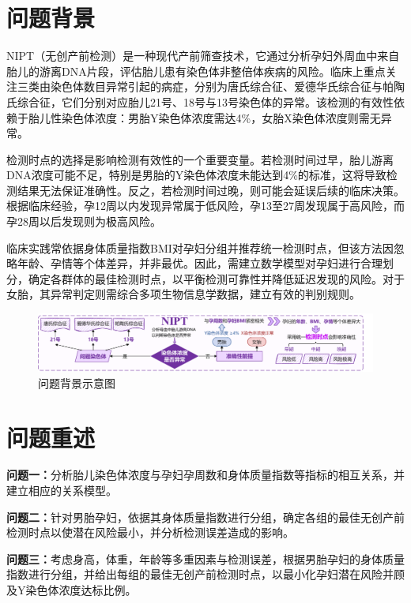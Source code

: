 \section{问题背景}


NIPT（无创产前检测）是一种现代产前筛查技术，它通过分析孕妇外周血中来自胎儿的游离DNA片段，评估胎儿患有染色体非整倍体疾病的风险。临床上重点关注三类由染色体数目异常引起的病症，分别为唐氏综合征、爱德华氏综合征与帕陶氏综合征，它们分别对应胎儿21号、18号与13号染色体的异常。该检测的有效性依赖于胎儿性染色体浓度：男胎Y染色体浓度需达4\%，女胎X染色体浓度则需无异常。

检测时点的选择是影响检测有效性的一个重要变量。若检测时间过早，胎儿游离DNA浓度可能不足，特别是男胎的Y染色体浓度未能达到4\%的标准，这将导致检测结果无法保证准确性。反之，若检测时间过晚，则可能会延误后续的临床决策。根据临床经验，孕12周以内发现异常属于低风险，孕13至27周发现属于高风险，而孕28周以后发现则为极高风险。

临床实践常依据身体质量指数BMI对孕妇分组并推荐统一检测时点，但该方法因忽略年龄、孕情等个体差异，并非最优。因此，需建立数学模型对孕妇进行合理划分，确定各群体的最佳检测时点，以平衡检测可靠性并降低延迟发现的风险。对于女胎，其异常判定则需综合多项生物信息学数据，建立有效的判别规则。


\begin{figure}[H]
	\centering
	\includegraphics[width=\textwidth]{figs/1前置/问题背景.pdf}
	\caption{问题背景示意图}
\end{figure}

\section{问题重述}

\textbf{问题一：}分析胎儿染色体浓度与孕妇孕周数和身体质量指数等指标的相互关系，并建立相应的关系模型。

\textbf{问题二：}针对男胎孕妇，依据其身体质量指数进行分组，确定各组的最佳无创产前检测时点以使潜在风险最小，并分析检测误差造成的影响。

\textbf{问题三：}考虑身高，体重，年龄等多重因素与检测误差，根据男胎孕妇的身体质量指数进行分组，并给出每组的最佳无创产前检测时点，以最小化孕妇潜在风险并顾及Y染色体浓度达标比例。

